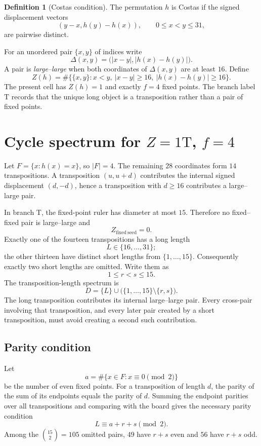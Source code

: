 \documentclass[11pt,a4paper]{article}
\theoremstyle{definition}\newtheorem{definition}[theorem]{Definition}\newtheorem{remark}[theorem]{Remark}
\newcommand{\abs}[1]{\left|#1\right|}
\begin{document}
\begin{definition}[Costas condition]
The permutation $h$ is Costas if the signed displacement vectors
\[
(y-x,h(y)-h(x)),\qquad 0\le x<y\le31,
\]
are pairwise distinct.
\end{definition}

For an unordered pair $\{x,y\}$ of indices write
\[
\Delta(x,y)=\bigl(\abs{x-y},\abs{h(x)-h(y)}\bigr).
\]
A pair is \emph{large--large} when both coordinates of $\Delta(x,y)$ are at least $16$.  Define
\[
Z(h)=\#\bigl\{\{x,y\}:x<y,\ \abs{x-y}\ge16,\ \abs{h(x)-h(y)}\ge16\bigr\}.
\]
The present cell has $Z(h)=1$ and exactly $f=4$ fixed points.  The branch label $\mathrm T$ records that the unique long object is a transposition rather than a pair of fixed points.

\section{Cycle spectrum for $Z=1\mathrm T$, $f=4$}
Let $F=\{x:h(x)=x\}$, so $\abs F=4$.  The remaining $28$ coordinates form $14$ transpositions.  A transposition $(u,u+d)$ contributes the internal signed displacement $(d,-d)$, hence a transposition with $d\ge16$ contributes a large--large pair.

In branch $\mathrm T$, the fixed-point ruler has diameter at most $15$.  Therefore no fixed--fixed pair is large--large and
\[
Z_{\mathrm{fixed\ seed}}=0.
\]
Exactly one of the fourteen transpositions has a long length
\[
L\in\{16,\ldots,31\};
\]
the other thirteen have distinct short lengths from $\{1,\ldots,15\}$.  Consequently exactly two short lengths are omitted.  Write them as
\[
1\le r<s\le15.
\]
The transposition-length spectrum is
\[
D=\{L\}\cup\bigl(\{1,\ldots,15\}\setminus\{r,s\}\bigr).
\]
The long transposition contributes its internal large--large pair.  Every cross-pair involving that transposition, and every later pair created by a short transposition, must avoid creating a second such contribution.

\subsection{Parity condition}
Let
\[
a=\#\{x\in F:x\equiv0\pmod2\}
\]
be the number of even fixed points.  For a transposition of length $d$, the parity of the sum of its endpoints equals the parity of $d$.  Summing the endpoint parities over all transpositions and comparing with the board gives the necessary parity condition
\begin{equation}\label{eq:parity}
L\equiv a+r+s\pmod2.
\end{equation}
Among the $\binom{15}{2}=105$ omitted pairs, $49$ have $r+s$ even and $56$ have $r+s$ odd.
\end{document}
